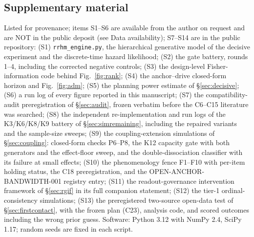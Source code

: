 \documentclass[9pt,twocolumn]{article}
\begin{document}
\subsection*{Supplementary material}
Listed for provenance; items S1--S6 are available from the author on request and are NOT in the public deposit (see Data availability); S7--S14 are in the public repository: (S1) \texttt{rrhm\_engine.py}, the hierarchical generative model of the decisive experiment and the discrete-time hazard likelihood; (S2) the gate battery, rounds 1--4, including the corrected negative controls; (S3) the design-level Fisher-information code behind Fig.~\ref{fig:rank}; (S4) the anchor--drive closed-form horizon and Fig.~\ref{fig:adm}; (S5) the planning power estimate of \S\ref{sec:decisive}; (S6) a run log of every figure reported in this manuscript; (S7) the compatibility-audit preregistration of \S\ref{sec:audit}, frozen verbatim before the C6--C15 literature was searched; (S8) the independent re-implementation and run logs of the K3/K6/K8/K9 battery of \S\ref{sec:simremaining}, including the repaired variants and the sample-size sweeps; (S9) the coupling-extension simulations of \S\ref{sec:coupling}: closed-form checks P6--P8, the K12 capacity gate with both generators and the effect-floor sweep, and the double-dissociation classifier with its failure at small effects; (S10) the phenomenology fence F1--F10 with per-item holding status, the C18 preregistration, and the OPEN-ANCHOR-BANDWIDTH-001 registry entry; (S11) the readout-governance intervention framework of \S\ref{sec:rgif} in its full companion statement; (S12) the tier-1 ordinal-consistency simulations; (S13) the preregistered two-source open-data test of \S\ref{sec:firstcontact}, with the frozen plan (C23), analysis code, and scored outcomes including the wrong prior guess. Software: Python 3.12 with NumPy 2.4, SciPy 1.17; random seeds are fixed in each script.
\end{document}
